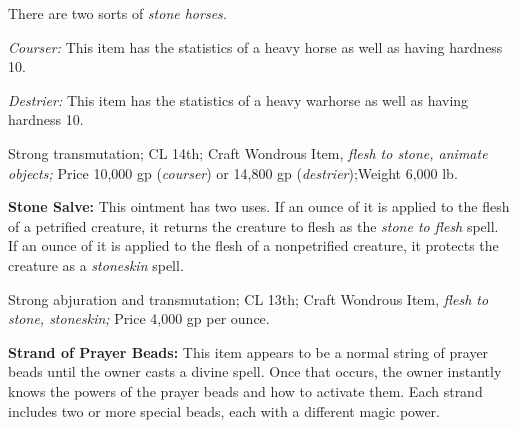 There are two sorts of \textit{stone horses.}

\textit{Courser: }This item has the statistics of a heavy horse as well as having 
hardness 10.

\textit{Destrier: }This item has the statistics of a heavy warhorse as well as 
having hardness 10.

Strong transmutation; CL 14th; Craft Wondrous Item, \textit{flesh to stone, animate 
objects; }Price 10,000 gp (\textit{courser}) or 14,800 gp (\textit{destrier});Weight 
6,000 lb.

\textbf{Stone Salve:} This ointment has two uses. If an ounce of it is applied 
to the flesh of a petrified creature, it returns the creature to flesh as the \textit{stone 
to flesh }spell. If an ounce of it is applied to the flesh of a nonpetrified creature, 
it protects the creature as a \textit{stoneskin }spell.

Strong abjuration and transmutation; CL 13th; Craft Wondrous Item, \textit{flesh 
to stone, stoneskin; }Price 4,000 gp per ounce.

\textbf{Strand of Prayer Beads:} This item appears to be a normal string of prayer 
beads until the owner casts a divine spell. Once that occurs, the owner instantly 
knows the powers of the prayer beads and how to activate them. Each strand includes 
two or more special beads, each with a different magic power.

